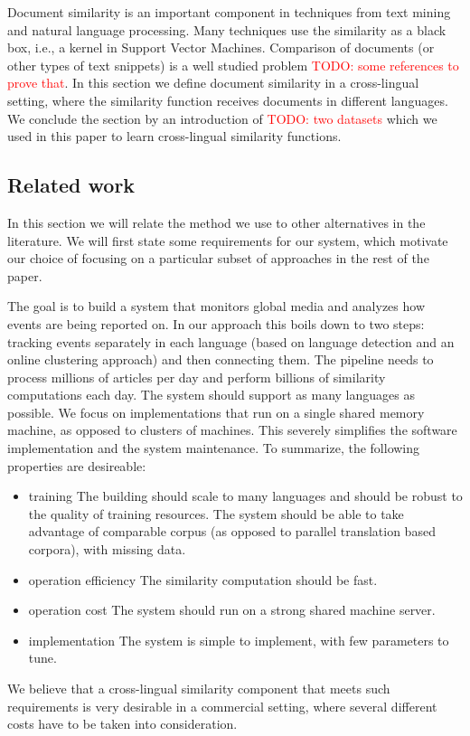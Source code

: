 \documentclass[twoside,11pt]{article}
\newcommand{\todo}[1]{\textcolor{red}{TODO: #1}}
\begin{document}
Document similarity is an important component in techniques from text mining and natural language processing. Many techniques use the similarity as a black box, i.e., a kernel in Support Vector Machines. Comparison of documents (or other types of text snippets) is a well studied problem \todo{some references to prove that}. In this section we define document similarity in a cross-lingual setting, where the similarity function receives documents in different languages. We conclude the section by an introduction of \todo{two datasets} which we used in this paper to learn cross-lingual similarity functions.

\subsection{Related work}

In this section we will relate the method we use to other alternatives in the literature. We will first state some requirements for our system, which motivate our choice of focusing on a particular subset of approaches in the rest of the paper.

The goal is to build a system that monitors global media and analyzes how events are being reported on. In our approach this boils down to two steps: tracking events separately in each language (based on language detection and an online clustering approach) and then connecting them. The pipeline needs to process millions of articles per day and perform billions of similarity computations each day. The system should support as many languages as possible. We focus on implementations that run on a single shared memory machine, as opposed to clusters of machines. This severely simplifies the software implementation and the system maintenance. 
To summarize, the following properties are desireable:
\begin{itemize}
\item{training} The building should scale to many languages and should be robust to the quality of training resources. The system should be able to take advantage of comparable corpus (as opposed to parallel translation based corpora), with missing data.
\item{operation efficiency} The similarity computation should be fast.
\item{operation cost} The system should run on a strong shared machine server. 
\item{implementation} The system is simple to implement, with few parameters to tune.
\end{itemize}
We believe that a cross-lingual similarity component that meets such requirements is very desirable in a commercial setting, where several different costs have to be taken into consideration.
\end{document}

